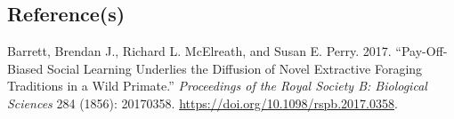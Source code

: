 \documentclass[
  letterpaper,
  DIV=11,
  numbers=noendperiod]{scrartcl}
\newlength{\cslhangindent}
\newenvironment{CSLReferences}[2] %
 {\begin{list}{}{%
  \setlength{\itemindent}{0pt}
  \setlength{\leftmargin}{0pt}
  \setlength{\parsep}{0pt}
  \ifodd #1
   \setlength{\leftmargin}{\cslhangindent}
   \setlength{\itemindent}{-1\cslhangindent}
  \fi
  \setlength{\itemsep}{#2\baselineskip}}}
 {\end{list}}
\begin{document}
\subsection*{Reference(s)}\label{references}

\label{refs}
\begin{CSLReferences}{1}{0}
Barrett, Brendan J., Richard L. McElreath, and Susan E. Perry. 2017.
{``Pay-Off-Biased Social Learning Underlies the Diffusion of Novel
Extractive Foraging Traditions in a Wild Primate.''} \emph{Proceedings
of the Royal Society B: Biological Sciences} 284 (1856): 20170358.
\url{https://doi.org/10.1098/rspb.2017.0358}.

\end{CSLReferences}
\end{document}
